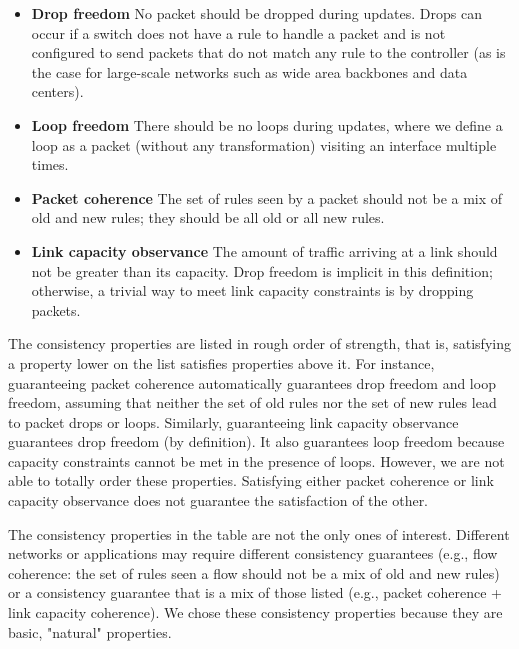 \begin{itemize}

\item
\textbf{Drop freedom} No packet should be dropped during updates. Drops can occur if a switch does not have a rule to handle a packet and is not configured to send packets that do not match any rule to the controller (as is the case for large-scale networks such as wide area backbones and data centers).

\item
\textbf{Loop freedom} There should be no loops during updates, where we define a loop as a packet (without any transformation) visiting an interface multiple times.
    
\item
\textbf{Packet coherence} The set of rules seen by a packet should not be a mix of old and new rules; they should be all old or all new rules.

\item
\textbf{Link capacity observance} The amount of traffic arriving at a link should not be greater than its capacity. Drop freedom is implicit in this definition; otherwise, a trivial way to meet link capacity constraints is by dropping packets.

\end{itemize}

The consistency properties are listed in rough order of strength, that is, satisfying a property lower on the list satisfies properties above it. For instance, guaranteeing packet coherence automatically guarantees drop freedom and loop freedom, assuming that neither the set of old rules nor the set of new rules lead to packet drops or loops. Similarly, guaranteeing link capacity observance guarantees drop freedom (by definition). It also guarantees loop freedom  because capacity constraints cannot be met in the presence of loops.  However, we are not able to totally order these properties. Satisfying either packet coherence or link capacity observance does not guarantee the satisfaction of the other.

The consistency properties in the table are not the only ones of interest. Different networks or applications may require different consistency guarantees (e.g., flow coherence: the set of rules seen a flow should not be a mix of old and new rules) or a consistency guarantee that is a mix of those listed (e.g., packet coherence + link capacity coherence). We chose these consistency properties because they are basic, "natural" properties.

